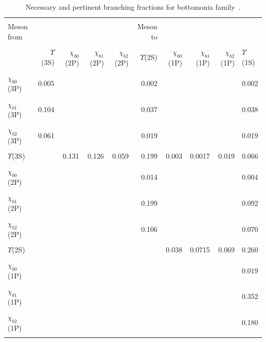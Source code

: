 \documentclass[review]{elsarticle}
\begin{document}
\begin{table}
  \centering
  \caption{Necessary and pertinent branching fractions for bottomonia family~\cite{Han:2014kxa,Zyla:2020zbs}.}
  \footnotesize
  \begin{tabular*}{\textwidth}{@{\extracolsep{\fill}}lrrrrrrrrl@{}}
    \hline
    \hline
    & & & & & & & & &\\
    Meson from & & & & & Meson to & & & & \\ \\
    \hline 
    &$\Upsilon$(3S) &$\chi_{b0}$(2P) &$\chi_{b1}$(2P) &$\chi_{b2}$(2P) &$\Upsilon$(2S) &$\chi_{b0}$(1P) &$\chi_{b1}$(1P) &$\chi_{b2}$(1P) &$\Upsilon$(1S)\\
    \hline
    \hline \\
    $\chi_{b0}$(3P) &0.005 & & & &0.002 & & & & 0.002 \\ \\
    $\chi_{b1}$(3P) &0.104 & & & &0.037 & & & & 0.038 \\ \\
    $\chi_{b2}$(3P) &0.061 & & & &0.019 & & & & 0.019 \\ \\
    $\Upsilon$(3S) & & 0.131 &0.126 & 0.059 & 0.199 & 0.003 & 0.0017 & 0.019 & 0.066 \\ \\
    $\chi_{b0}$(2P) & & & & &0.014 & & & & 0.004 \\ \\
    $\chi_{b1}$(2P) & & & & &0.199 & & & & 0.092 \\ \\
    $\chi_{b2}$(2P) & & & & &0.106 & & & & 0.070 \\ \\
    $\Upsilon$(2S) & & & & & & 0.038 & 0.0715 & 0.069 & 0.260 \\ \\
    $\chi_{b0}$(1P) & & & & & & & & & 0.019 \\ \\
    $\chi_{b1}$(1P) & & & & & & & & & 0.352 \\ \\
    $\chi_{b2}$(1P) & & & & & & & & & 0.180 \\ \\
    \hline
    \hline
  \end{tabular*}
  \label{BRUpsilon}
\end{table}
\end{document}
